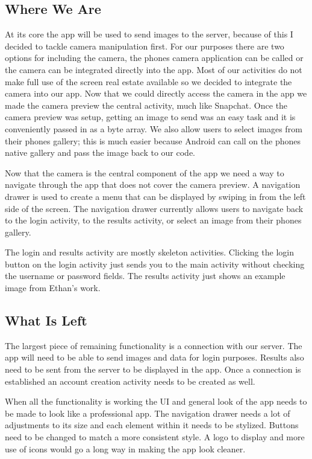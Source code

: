 \documentclass[onecolumn, draftclsnofoot,10pt, compsoc]{IEEEtran}
\begin{document}
	\subsection{Where We Are}
		At its core the app will be used to send images to the server, because of this I decided to tackle camera manipulation first.
		For our purposes there are two options for including the camera, the phones camera application can be called or the camera can be integrated directly into the app.
		Most of our activities do not make full use of the screen real estate available so we decided to integrate the camera into our app.
		Now that we could directly access the camera in the app we made the camera preview the central activity, much like Snapchat.
		Once the camera preview was setup, getting an image to send was an easy task and it is conveniently passed in as a byte array.
		We also allow users to select images from their phones gallery; this is much easier because Android can call on the phones native gallery and pass the image back to our code.

		Now that the camera is the central component of the app we need a way to navigate through the app that does not cover the camera preview.
		A navigation drawer is used to create a menu that can be displayed by swiping in from the left side of the screen.
		The navigation drawer currently allows users to navigate back to the login activity, to the results activity, or select an image from their phones gallery.

		The login and results activity are mostly skeleton activities.
		Clicking the login button on the login activity just sends you to the main activity without checking the username or password fields.
		The results activity just shows an example image from Ethan's work.

	\subsection{What Is Left}
		The largest piece of remaining functionality is a connection with our server.
		The app will need to be able to send images and data for login purposes.
		Results also need to be sent from the server to be displayed in the app.
		Once a connection is established an account creation activity needs to be created as well.

		When all the functionality is working the UI and general look of the app needs to be made to look like a professional app.
		The navigation drawer needs a lot of adjustments to its size and each element within it needs to be stylized.
		Buttons need to be changed to match a more consistent style.
		A logo to display and more use of icons would go a long way in making the app look cleaner.
\end{document}
